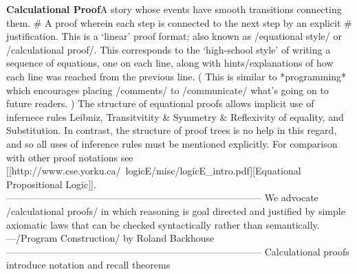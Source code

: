 \documentclass[11pt]{article}
\begin{document}
\vspace{1em}\textbf{Calculational Proof}\quad\label{org-special-block-extras-glossary-Calculational_Proof}A story whose events have smooth transitions connecting them.  # A proof wherein each step is connected to the next step by an explicit # justification.  This is a ‘linear’ proof format; also known as /equational style/ or /calculational proof/. This corresponds to the ‘high-school style’ of writing a sequence of equations, one on each line, along with hints/explanations of how each line was reached from the previous line. ( This is similar to *programming* which encourages placing /comments/ to /communicate/ what's going on to future readers. )  The structure of equational proofs allows implicit use of infernece rules Leibniz, Transitvitity \& Symmetry \& Reflexivity of equality, and Substitution. In contrast, the structure of proof trees is no help in this regard, and so all uses of inference rules must be mentioned explicitly.  For comparison with other proof notations see [[http://www.cse.yorku.ca/~logicE/misc/logicE_intro.pdf][Equational Propositional Logic]].  --------------------------------------------------------------------------------  We advocate /calculational proofs/ in which reasoning is goal directed and justified by simple axiomatic laws that can be checked syntactically rather than semantically. ---/Program Construction/ by Roland Backhouse  --------------------------------------------------------------------------------  Calculational proofs introduce notation and recall theorems 
\end{document}
